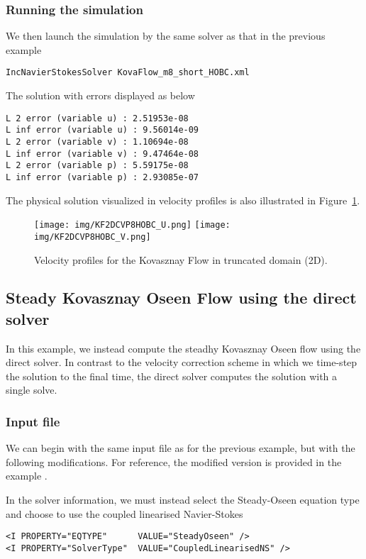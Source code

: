 \subsubsection{Running the simulation}
We then launch the simulation by the same solver as that in the previous example
\begin{lstlisting}[style=BashInputStyle]
IncNavierStokesSolver KovaFlow_m8_short_HOBC.xml
\end{lstlisting} 
 The solution with errors displayed as below
\begin{lstlisting}[style=BashInputStyle]
L 2 error (variable u) : 2.51953e-08
L inf error (variable u) : 9.56014e-09
L 2 error (variable v) : 1.10694e-08
L inf error (variable v) : 9.47464e-08
L 2 error (variable p) : 5.59175e-08
L inf error (variable p) : 2.93085e-07
\end{lstlisting}

The physical solution visualized in velocity profiles is also illustrated in 
Figure~\ref{f:incns:kovaflow2d_hobc}.

\begin{figure}
\begin{center}
\texttt{[image: img/KF2DCVP8HOBC\_U.png]}
\texttt{[image: img/KF2DCVP8HOBC\_V.png]}
\caption{Velocity profiles for the Kovasznay Flow in truncated domain (2D).}
\label{f:incns:kovaflow2d_hobc}
\end{center}
\end{figure}

\subsection{Steady Kovasznay Oseen Flow using the direct solver}
\label{s:incns:kovasznay2Ddirect}
In this example, we instead compute the steadhy Kovasznay Oseen flow
using the direct solver. In contrast to the velocity correction scheme in which
we time-step the solution to the final time, the direct solver computes the
solution with a single solve.

\subsubsection{Input file}
We can begin with the same input file as for the previous example, but with the
following modifications. For reference, the modified version is provided in the
example .

In the solver information, we must instead select the
Steady-Oseen equation type and choose to use the coupled linearised
Navier-Stokes
\begin{lstlisting}[style=XMLStyle]
<I PROPERTY="EQTYPE"      VALUE="SteadyOseen" />
<I PROPERTY="SolverType"  VALUE="CoupledLinearisedNS" />
\end{lstlisting}

